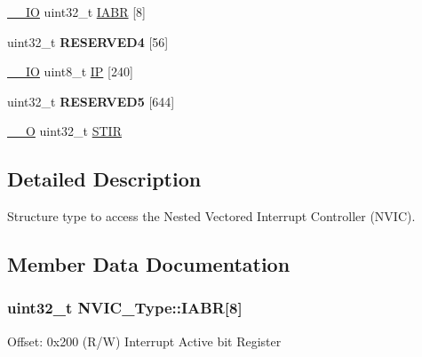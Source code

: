\begin{DoxyCompactItemize}
\item 
\hyperlink{core__cm4_8h_aec43007d9998a0a0e01faede4133d6be}{\+\_\+\+\_\+\+IO} uint32\+\_\+t \hyperlink{struct_n_v_i_c___type_a33e917b381e08dabe4aa5eb2881a7c11}{I\+A\+BR} \mbox{[}8\mbox{]}
\item 
uint32\+\_\+t {\bfseries R\+E\+S\+E\+R\+V\+E\+D4} \mbox{[}56\mbox{]}\hypertarget{struct_n_v_i_c___type_a5c0e5d507ac3c1bd5cdaaf9bbd177790}{}\label{struct_n_v_i_c___type_a5c0e5d507ac3c1bd5cdaaf9bbd177790}

\item 
\hyperlink{core__cm4_8h_aec43007d9998a0a0e01faede4133d6be}{\+\_\+\+\_\+\+IO} uint8\+\_\+t \hyperlink{struct_n_v_i_c___type_a6524789fedb94623822c3e0a47f3d06c}{IP} \mbox{[}240\mbox{]}
\item 
uint32\+\_\+t {\bfseries R\+E\+S\+E\+R\+V\+E\+D5} \mbox{[}644\mbox{]}\hypertarget{struct_n_v_i_c___type_a4f753b4f824270175af045ac99bc12e8}{}\label{struct_n_v_i_c___type_a4f753b4f824270175af045ac99bc12e8}

\item 
\hyperlink{core__cm4_8h_a7e25d9380f9ef903923964322e71f2f6}{\+\_\+\+\_\+O} uint32\+\_\+t \hyperlink{struct_n_v_i_c___type_a0b0d7f3131da89c659a2580249432749}{S\+T\+IR}
\end{DoxyCompactItemize}


\subsection{Detailed Description}
Structure type to access the Nested Vectored Interrupt Controller (N\+V\+IC). 

\subsection{Member Data Documentation}
\subsubsection[{\texorpdfstring{I\+A\+BR}{IABR}}]{ uint32\+\_\+t N\+V\+I\+C\+\_\+\+Type\+::\+I\+A\+BR\mbox{[}8\mbox{]}}\hypertarget{struct_n_v_i_c___type_a33e917b381e08dabe4aa5eb2881a7c11}{}\label{struct_n_v_i_c___type_a33e917b381e08dabe4aa5eb2881a7c11}
Offset\+: 0x200 (R/W) Interrupt Active bit Register 
